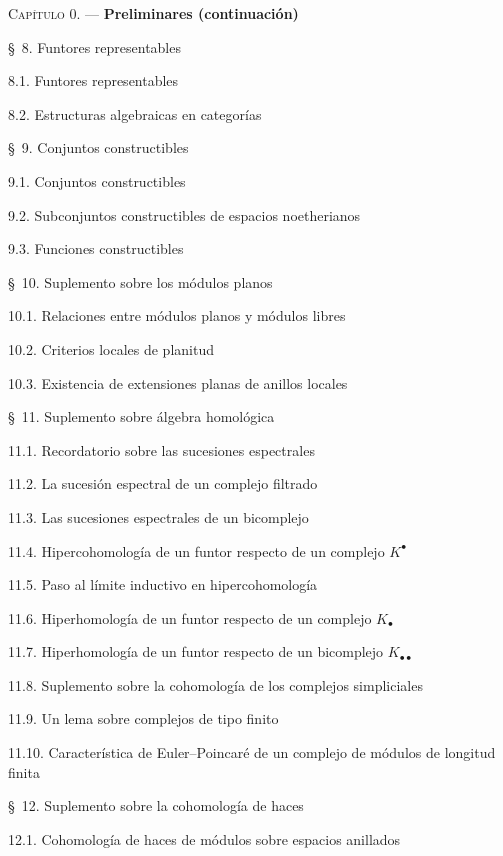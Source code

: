 \documentclass[oneside]{amsart}
\begin{document}
\begin{flushleft}
\textsc{Capítulo 0.} --- \textbf{Preliminares (continuación)} 

\medskip
\S~8. Funtores representables 

8.1. Funtores representables 

8.2. Estructuras algebraicas en categorías 

\medskip
\S~9. Conjuntos constructibles 

9.1. Conjuntos constructibles 

9.2. Subconjuntos constructibles de espacios noetherianos 

9.3. Funciones constructibles 

\medskip
\S~10. Suplemento sobre los módulos planos 

10.1. Relaciones entre módulos planos y módulos libres 

10.2. Criterios locales de planitud 

10.3. Existencia de extensiones planas de anillos locales 

\medskip
\S~11. Suplemento sobre álgebra homológica 

11.1. Recordatorio sobre las sucesiones espectrales 

11.2. La sucesión espectral de un complejo filtrado 

11.3. Las sucesiones espectrales de un bicomplejo 

11.4. Hipercohomología de un funtor respecto de un complejo $K^\bullet$

11.5. Paso al límite inductivo en hipercohomología 

11.6. Hiperhomología de un funtor respecto de un complejo $K_\bullet$

11.7. Hiperhomología de un funtor respecto de un bicomplejo
$K_{\bullet\bullet}$ 

11.8. Suplemento sobre la cohomología de los complejos simpliciales 

11.9. Un lema sobre complejos de tipo finito 

11.10. Característica de Euler--Poincaré de un complejo de módulos de longitud finita

\medskip
\S~12. Suplemento sobre la cohomología de haces 

12.1. Cohomología de haces de módulos sobre espacios anillados 


\end{flushleft}
\end{document}
